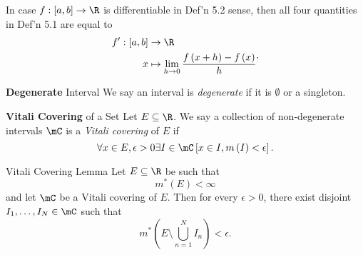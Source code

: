 \documentclass[pmath451]{subfiles}
\begin{document}
    \np In case $f:\left[ a,b \right]\to\R$ is differentiable in Def'n 5.2 sense, then all four quantities in Def'n 5.1 are equal to
    \begin{equation*}
        \begin{aligned}
            f':\left[ a,b \right]&\to\R\\
            x&\mapsto\lim_{h\to 0} \frac{f\left( x+h \right)-f\left( x \right)}{h}
        \end{aligned} .
    \end{equation*}

    \clearpage
    
    \begin{definition}{\textbf{Degenerate} Interval}
        We say an interval is \emph{degenerate} if it is $\emptyset$ or a singleton.
    \end{definition}
    
    \begin{definition}{\textbf{Vitali Covering} of a Set}
        Let $E\subseteq\R$. We say a collection of non-degenerate intervals $\mC$ is a \emph{Vitali covering} of $E$ if
        \begin{equation*}
            \forall x\in E, \epsilon>0\exists I\in\mC \left[ x\in I, m\left( I \right)<\epsilon \right].
        \end{equation*}
    \end{definition}
    
    \begin{theorem}{Vitali Covering Lemma}
        Let $E\subseteq\R$ be such that
        \begin{equation*}
            m^{*}\left( E \right) < \infty
        \end{equation*}
        and let $\mC$ be a Vitali covering of $E$. Then for every $\epsilon>0$, there exist disjoint $I_1,\ldots,I_N\in\mC$ such that
        \begin{equation*}
            m^{*}\left( E\setminus\bigcup^{N}_{n=1}I_n \right) < \epsilon.
        \end{equation*}
    \end{theorem}
    
\end{document}
